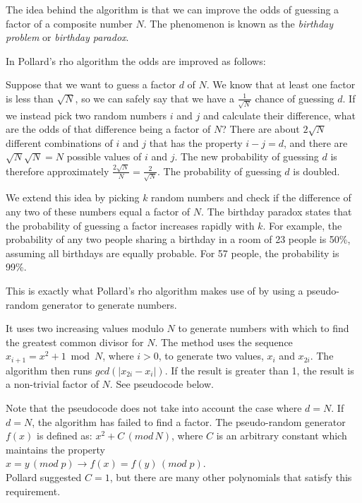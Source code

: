 \documentclass[paper=a4, fontsize=11pt,numbers=endperiod]{scrartcl} %
\providecommand{\abs}[1]{\lvert#1\rvert} %
\numberwithin{equation}{section} %
\numberwithin{figure}{section} %
\numberwithin{table}{section} %
\begin{document}
The idea behind the algorithm is that we can improve the odds of guessing a factor of a composite number $N$.
The phenomenon is known as the \emph{birthday problem} or \emph{birthday paradox}\cite{birthday}.

In Pollard's rho algorithm the odds are improved as follows:

Suppose that we want to guess a factor $d$ of $N$. We know that at least one factor is less than $\sqrt{N}$, so we can safely say that we have a $\frac{1}{\sqrt{N}}$ chance of guessing $d$. If we instead pick two random numbers $i$ and $j$ and calculate their difference, what are the odds of that difference being a factor of $N$? There are about $2\sqrt{N}$ different combinations of $i$ and $j$ that has the property $i - j = d$, and there are $\sqrt{N}\sqrt{N} = N$ possible values of $i$ and $j$. The new probability of guessing $d$ is therefore approximately $\frac{2\sqrt{N}}{N} = \frac{2}{\sqrt{N}}$. The probability of guessing $d$ is doubled. \cite{colorado}

We extend this idea by picking $k$ random numbers and check if the difference of any two of these numbers equal a factor of $N$. The birthday paradox states that the probability of guessing a factor increases rapidly with $k$. For example, the probability of any two people sharing a birthday in a room of 23 people is 50\%, assuming all birthdays are equally probable. For 57 people, the probability is 99\%.

This is exactly what Pollard's rho algorithm makes use of by using a pseudo-random generator to generate numbers.

It uses two increasing values modulo $N$ to generate numbers with which to find the greatest common divisor for $N$.
The method uses the sequence $x_{i+1} = x^2 + 1 \bmod N$, where $i > 0$, to generate two values, $x_i$ and $x_{2i}$.
The algorithm then runs $gcd(\abs{x_{2i}-x_i})$. If the result is greater than 1, the result is a non-trivial factor of $N$. See pseudocode below.  %


Note that the pseudocode does not take into account the case where $d = N$. If $d = N$, the algorithm has failed to find a factor. The pseudo-random generator $f(x)$ is defined as: $x^2+C\, (mod\, N)$, where $C$ is an arbitrary constant which maintains the property\\ $x = y\, (mod\; p) \rightarrow f(x) = f(y)\,(mod\; p)$.\\ Pollard suggested $C = 1$, but there are many other polynomials that satisfy this requirement.\\ %
\end{document}
